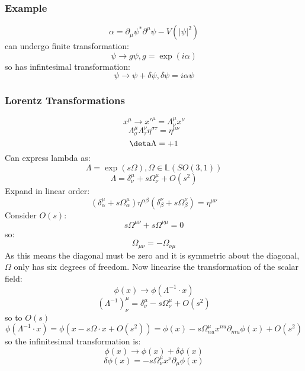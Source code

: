 \documentclass[12pt, a4paper, twoside, titlepage]{article}
\begin{document}
\subsubsection{Example}
$$
\alpha = \partial_{\mu}\psi^* \partial^{\mu} \psi - V(|\psi|^2)
$$
can undergo finite transformation:
$$
\psi \rightarrow g \psi, g = \exp(i \alpha)
$$
so has infintesimal transformation:
$$
\psi \rightarrow \psi + \delta \psi, \delta \psi = i\alpha \psi
$$
\subsubsection{Lorentz Transformations}
$$
x^{\mu} \rightarrow x'^{\mu} = \Lambda^{\mu}_{\nu} x^{\nu}
$$
$$
\Lambda^{\mu}_{\sigma}\Lambda^{\nu}_{\tau}\eta^{\sigma \tau} = \eta^{\mu \nu}
$$
$$\deta \Lambda = +1$$
Can express lambda as:
$$
\Lambda = \exp(s \Omega), \Omega \in \mathbb{L}(SO(3,1))
$$
$$
\Lambda = \delta^{\mu}_{\nu} + s \Omega^{\mu}_{\nu} + O(s^2)
$$
Expand in linear order:
$$
(\delta^{\mu}_{\alpha} + s \Omega^{\mu}_{\alpha})\eta^{\alpha \beta}(\delta^{\nu}_{\beta} + s \Omega^{\nu}_{\beta}) = \eta^{\mu \nu}
$$
Consider $O(s)$:
$$
s\Omega^{\mu \nu} + s\Omega^{\nu \mu} = 0 
$$
so:
$$
\Omega_{\mu \nu} = - \Omega_{\nu \mu} 
$$
As this means the diagonal must be zero and it is symmetric about the diagonal, $\Omega$ only has six degrees of freedom. Now linearise the transformation of the scalar field:
$$
\phi(x) \rightarrow \phi(\Lambda^{-1} \cdot x)
$$
$$
(\Lambda^{-1})^{\mu}_{\nu} =  \delta^{\mu}_{\nu} - s \Omega^{\mu}_{\nu} + O(s^2)
$$
so to $O(s)$
$$
\phi(\Lambda^{-1} \cdot x) = \phi(x - s \Omega \cdot x + O(s^2)) = \phi(x) - s\Omega^{\mu}_{nu}x^{nu}\partial_{mu}\phi(x) + O(s^2)
$$
so the infinitesimal transformation is:
$$
        \phi(x) \rightarrow \phi(x) + \delta\phi(x)
  $$      
\begin{equation}
        \delta \phi(x) = -s \Omega^{\mu}_{\nu}x^{\nu}\partial_{\mu}\phi(x)
\end{equation}
\end{document}
